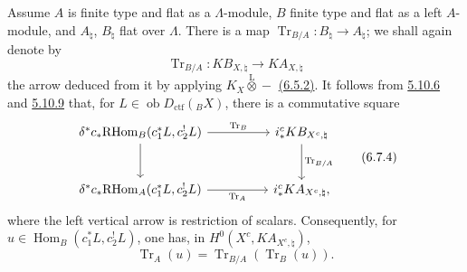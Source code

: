 \documentclass[11pt]{article}
\DeclareMathOperator{\Hom}{Hom}
\providecommand{\RHom}{\mathrm{RHom}}
\providecommand{\Tr}{\operatorname{Tr}}
\providecommand{\Tr}{\operatorname{Tr}}
\providecommand{\lten}{\overset{\mathrm L}{\otimes}}
\providecommand{\Ob}{\operatorname{ob}}
\providecommand{\Tr}{\operatorname{Tr}}
\providecommand{\RHom}{\mathrm{RHom}}
\providecommand{\Hom}{\operatorname{Hom}}
\providecommand{\lten}{\overset{\mathrm L}{\otimes}}
\providecommand{\RHom}{\mathrm R\mathcal{H}om}
\providecommand{\lten}{\overset{\mathrm L}{\otimes}}
\providecommand{\Ob}{\operatorname{ob}}
\providecommand{\Tr}{\operatorname{Tr}}
\providecommand{\lten}{\overset{\mathrm L}{\otimes}}
\providecommand{\lten}{\overset{\mathrm L}{\otimes}}
\providecommand{\Ob}{\operatorname{Ob}}
\providecommand{\lten}{\overset{\mathrm L}{\otimes}}
\providecommand{\RHom}{\mathrm{RHom}}
\providecommand{\Hom}{\operatorname{Hom}}
\providecommand{\Tr}{\operatorname{Tr}}
\providecommand{\Ob}{\operatorname{ob}}
\providecommand{\Ob}{\operatorname{Ob}}
\providecommand{\lten}{\overset{\mathrm L}{\otimes}}
\begin{document}
Assume $A$ is finite type and flat as a $\Lambda$-module, $B$ finite type and flat as a left $A$-module, and $A_{\natural}$, $B_{\natural}$ flat over $\Lambda$. There is a map $\Tr_{B/A}:B_{\natural}\to A_{\natural}$; we shall again denote by
\begin{equation}
\Tr_{B/A}:KB_{X,\natural}\longrightarrow KA_{X,\natural}
\tag{6.7.3}\label{sga5:IIIB:equation:6.7.3}
\end{equation}
the arrow deduced from it by applying $K_X\lten -$ \hyperref[sga5:IIIB:equation:6.5.2]{(6.5.2)}. It follows from \hyperref[sga5:IIIB:proposition:5.10.6]{5.10.6} and \hyperref[sga5:IIIB:proposition:5.10.9]{5.10.9} that, for $L\in\Ob D_{\mathrm{ctf}}({}_BX)$, there is a commutative square
\begin{equation}
\begin{tikzcd}[column sep=huge,row sep=large]
\delta^*c_*\RHom_B(c_1^*L,c_2^!L) \arrow[r,"\Tr_B"] \arrow[d]
& i_*^cKB_{X^c,\natural} \arrow[d,"\Tr_{B/A}"]\\
\delta^*c_*\RHom_A(c_1^*L,c_2^!L) \arrow[r,"\Tr_A"']
& i_*^cKA_{X^c,\natural},
\end{tikzcd}
\tag{6.7.4}\label{sga5:IIIB:equation:6.7.4}
\end{equation}
where the left vertical arrow is restriction of scalars. Consequently, for $u\in\Hom_B(c_1^*L,c_2^!L)$, one has, in $H^0(X^c,KA_{X^c,\natural})$,
\begin{equation}
\Tr_A(u)=\Tr_{B/A}(\Tr_B(u)).
\tag{6.7.5}\label{sga5:IIIB:equation:6.7.5}
\end{equation}
\end{document}
